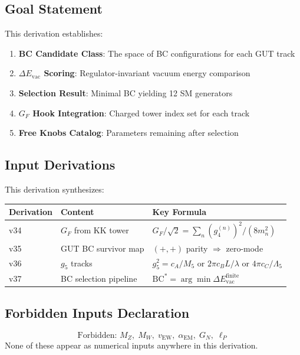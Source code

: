 \documentclass[11pt,a4paper]{article}
\begin{document}
\subsection{Goal Statement}
This derivation establishes:
\begin{enumerate}
    \item \textbf{BC Candidate Class}: The space of BC configurations for each GUT track
    \item \textbf{$\Delta E_{\text{vac}}$ Scoring}: Regulator-invariant vacuum energy comparison
    \item \textbf{Selection Result}: Minimal BC yielding 12 SM generators
    \item \textbf{$G_F$ Hook Integration}: Charged tower index set for each track
    \item \textbf{Free Knobs Catalog}: Parameters remaining after selection
\end{enumerate}

\subsection{Input Derivations}
This derivation synthesizes:
\begin{center}
\begin{tabular}{lll}
\toprule
Derivation & Content & Key Formula \\
\midrule
v34 & $G_F$ from KK tower & $G_F/\sqrt{2} = \sum_n (g_4^{(n)})^2/(8m_n^2)$ \\
v35 & GUT BC survivor map & $(+,+)$ parity $\Rightarrow$ zero-mode \\
v36 & $g_5$ tracks & $g_5^2 = c_A/M_5$ or $2\pi c_B L/\lambda$ or $4\pi c_C/\Lambda_5$ \\
v37 & BC selection pipeline & $\text{BC}^* = \arg\min \Delta E_{\text{vac}}^{\text{finite}}$ \\
\bottomrule
\end{tabular}
\end{center}

\subsection{Forbidden Inputs Declaration}
\begin{equation}
\label{eq:forbidden}
\boxed{\text{Forbidden: } M_Z,\; M_W,\; v_{\text{EW}},\; \alpha_{\text{EM}},\; G_N,\; \ell_P}
\end{equation}
None of these appear as numerical inputs anywhere in this derivation.
\end{document}

